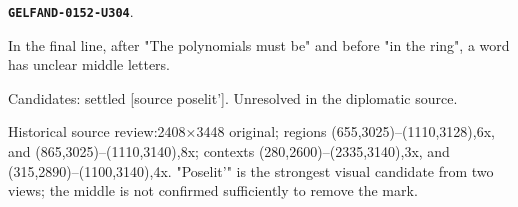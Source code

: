 \documentclass[11pt]{article}
\theoremstyle{definition}
\theoremstyle{remark}
\begin{document}
\par\noindent\leavevmode{}\label{GELFAND-0152-U304}\label{GELFAND-P001401:last-line-word:note}\textbf{\texttt{GELFAND-0152-U304}}.\nopagebreak[4]\par
In the final line, after "The polynomials must be" and before "in the ring", a word has unclear middle letters.\par
Candidates: settled [source poselit']. Unresolved in the diplomatic source.\par
Historical source review:2408×3448 original; regions (655,3025)–(1110,3128),6x, and (865,3025)–(1110,3140),8x; contexts (280,2600)–(2335,3140),3x, and (315,2890)–(1100,3140),4x. "Poselit'" is the strongest visual candidate from two views; the middle is not confirmed sufficiently to remove the mark.\par\medskip
\end{document}
